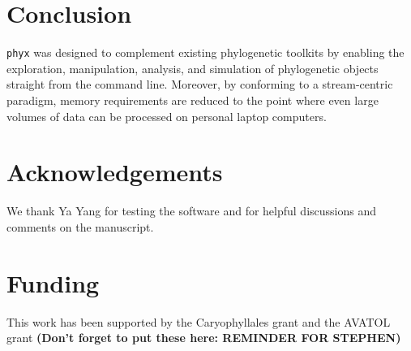 \documentclass{bioinfo}
\begin{document}
\section{Conclusion}

\texttt{phyx} was designed to complement existing phylogenetic toolkits by
enabling the exploration, manipulation, analysis, and simulation of
phylogenetic objects straight from the command line. Moreover, by conforming
to a stream-centric paradigm, memory requirements are reduced to the point
where even large volumes of data can be processed on personal laptop
computers. \vspace*{-10pt}

\section*{Acknowledgements}

We thank Ya Yang for testing the software and for helpful discussions and comments on the manuscript.\vspace*{-12pt}

\section*{Funding}

This work has been supported by the Caryophyllales grant and the AVATOL grant \textbf{(Don't forget to put these here: REMINDER FOR STEPHEN)}\vspace*{-12pt}


%
%
%
%
%
%

\end{document}
